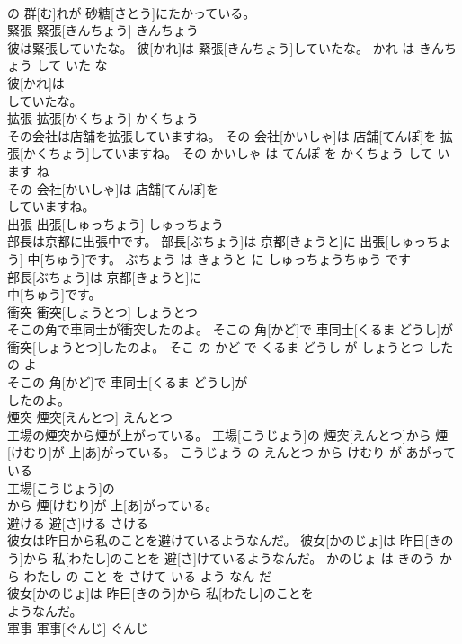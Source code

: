 \documentclass[8pt]{extreport}
\begin{document}
\begin{CJK}{UTF8}{min}
\\	の 群[む]れが 砂糖[さとう]にたかっている。			
\\	緊張	緊張[きんちょう]	きんちょう	
\\	彼は緊張していたな。	彼[かれ]は 緊張[きんちょう]していたな。	かれ は きんちょう して いた な	
\\	彼[かれ]は
\\	していたな。			
\\	拡張	拡張[かくちょう]	かくちょう	
\\	その会社は店舗を拡張していますね。	その 会社[かいしゃ]は 店舗[てんぽ]を 拡張[かくちょう]していますね。	その かいしゃ は てんぽ を かくちょう して います ね	
\\	その 会社[かいしゃ]は 店舗[てんぽ]を
\\	していますね。			
\\	出張	出張[しゅっちょう]	しゅっちょう	
\\	部長は京都に出張中です。	部長[ぶちょう]は 京都[きょうと]に 出張[しゅっちょう] 中[ちゅう]です。	ぶちょう は きょうと に しゅっちょうちゅう です	
\\	部長[ぶちょう]は 京都[きょうと]に
\\	中[ちゅう]です。			
\\	衝突	衝突[しょうとつ]	しょうとつ	
\\	そこの角で車同士が衝突したのよ。	そこの 角[かど]で 車同士[くるま どうし]が 衝突[しょうとつ]したのよ。	そこ の かど で くるま どうし が しょうとつ した の よ	
\\	そこの 角[かど]で 車同士[くるま どうし]が
\\	したのよ。			
\\	煙突	煙突[えんとつ]	えんとつ	
\\	工場の煙突から煙が上がっている。	工場[こうじょう]の 煙突[えんとつ]から 煙[けむり]が 上[あ]がっている。	こうじょう の えんとつ から けむり が あがって いる	
\\	工場[こうじょう]の
\\	から 煙[けむり]が 上[あ]がっている。			
\\	避ける	避[さ]ける	さける	
\\	彼女は昨日から私のことを避けているようなんだ。	彼女[かのじょ]は 昨日[きのう]から 私[わたし]のことを 避[さ]けているようなんだ。	かのじょ は きのう から わたし の こと を さけて いる よう なん だ	
\\	彼女[かのじょ]は 昨日[きのう]から 私[わたし]のことを
\\	ようなんだ。			
\\	軍事	軍事[ぐんじ]	ぐんじ	

\end{CJK}
\end{document}
